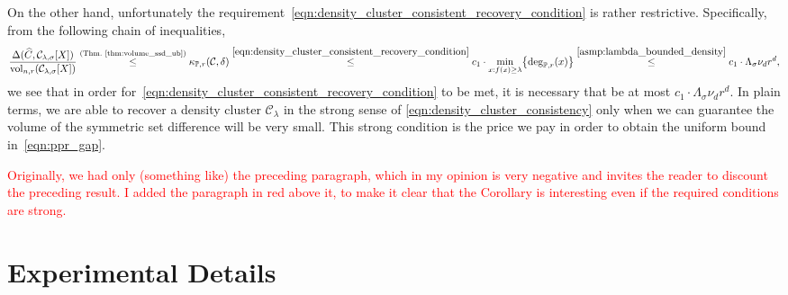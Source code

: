 \documentclass{article}
\newcommand{\vol}{\mathrm{vol}}
\newcommand{\1}{\mathbf{1}}
\newcommand{\mc}[1]{\mathcal{#1}}
\newcommand{\Pbb}{\mathbb{P}}
\newcommand{\wh}[1]{\widehat{#1}}
\theoremstyle{definition}
\theoremstyle{remark}
\begin{document}
On the other hand, unfortunately the requirement~\eqref{eqn:density_cluster_consistent_recovery_condition} is rather restrictive. Specifically, from the following chain of inequalities,
\begin{equation*}
\frac{\Delta(\wh{C}, \mc{C}_{\lambda,\sigma}[X])}{\vol_{n,r}(\mc{C}_{\lambda,\sigma}[X])} \overset{(\textrm{Thm.~\ref{thm:volume_ssd_ub}})}{\leq} \kappa_{\Pbb,r}(\mc{C},\delta) \overset{\eqref{eqn:density_cluster_consistent_recovery_condition}}{\leq} c_1 \cdot \min_{x: f(x) \geq \lambda} \bigl\{\deg_{\Pbb,r}(x)\bigr\} \overset{\ref{asmp:lambda_bounded_density}}{\leq} c_1 \cdot \Lambda_{\sigma} \nu_d r^d,
\end{equation*}
we see that in order for~\eqref{eqn:density_cluster_consistent_recovery_condition} to be met, it is necessary that \smash{$\Delta(\wh{C}, \mc{C}_{\lambda,\sigma}[X])/\vol_{n,r}(\mc{C}_{\lambda,\sigma}[X])$} be at most $c_1 \cdot \Lambda_{\sigma} \nu_d r^d$. In plain terms, we 
are able to recover a density cluster $\mc{C}_{\lambda}$ in the strong sense of
\eqref{eqn:density_cluster_consistency} only when we can guarantee the volume of the symmetric set difference will be very small. This strong condition is
the price we pay in order to obtain the uniform bound in~\eqref{eqn:ppr_gap}.\vspace{1 mm}

\textcolor{red}{Originally, we had only (something like) the preceding paragraph, which in my opinion is very negative and invites the reader to discount the preceding result. I added the paragraph in red above it, to make it clear that the Corollary is interesting even if the required conditions are strong.}


\section{Experimental Details}
\label{sec:experimental_details}

\clearpage

 
\end{document}
